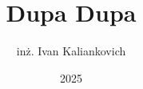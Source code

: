 \documentclass[thesis=mgr,faculty=gik]{EE-dyplom}
\title{Dupa Dupa}
\author{inż. Ivan Kaliankovich}
\date{2025}
\begin{document}
    \frontpages %

    
    \makeatletter
    \@openrightfalse
    \makeatother
    
    
    
    
    
    

    \bibliografia

    
    \acronymslist

    \listoffigures
    \listoftables
    \easyappendices
\end{document}
